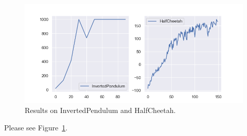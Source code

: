 \begin{figure}[htbp]
    \centering
    \includegraphics[width=1.0\linewidth]{figures/q5.png}
    \caption{Results on InvertedPendulum and HalfCheetah.}
    \label{fig:q5}
\end{figure}

Please see Figure~\ref{fig:q5}.